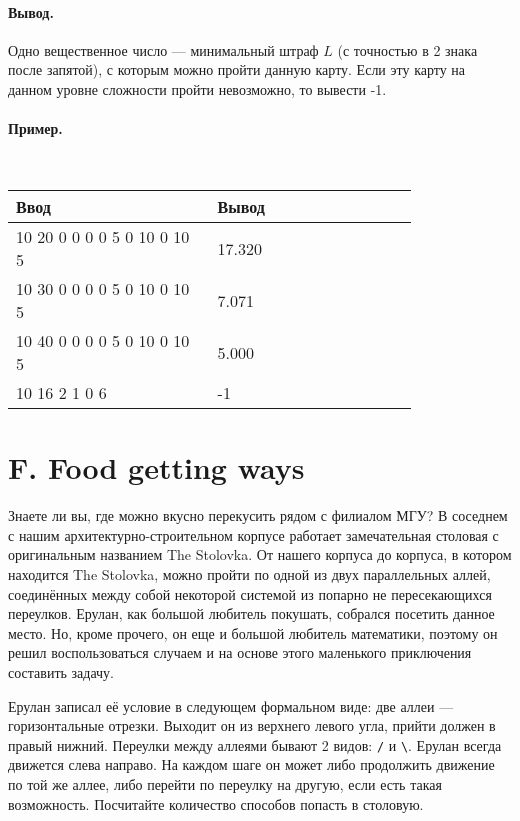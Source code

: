 \documentclass[12pt, a5paper]{article}
\newcommand{\outformat}[1]
{
	\paragraph{Вывод.\\} #1
}
\newcommand{\exampleeee}[8]
{
	\paragraph{Пример.\\}
	{\tt
	\begin{tabular}{|p{0.4\linewidth}|p{0.4\linewidth}|}
	\hline
	Ввод 	& Вывод  	\\
	\hline
	#1 		& #2 		\\
	\hline
	#3		& #4		\\
	\hline
	#5		& #6		\\
	\hline
	#7		& #8		\\
	\hline
	\end{tabular}
	}
}
\begin{document}
\outformat{Одно вещественное число --- минимальный штраф $L$ (с точностью в 2 знака после запятой), с которым можно пройти данную карту. Если эту карту на данном уровне сложности пройти невозможно, то вывести -1.}

\exampleeee{
10 20 \newline
5 \newline
5 0 0 \newline
10 0 0 \newline
10 5 0 \newline
10 10 0 \newline
10 10 5}
{17.320}
{10 30 \newline
5 \newline
5 0 0 \newline
10 0 0 \newline
10 5 0 \newline
10 10 0 \newline
10 10 5}
{7.071}
{10 40 \newline
5 \newline
5 0 0 \newline
10 0 0 \newline
10 5 0 \newline
10 10 0 \newline
10 10 5}
{5.000}
{10 16 \newline
2 \newline
6 2 1 \newline
4 0 6}
{-1}



\section*{F. Food getting ways}

Знаете ли вы, где можно вкусно перекусить рядом с филиалом МГУ? В соседнем с нашим архитектурно\--строительном корпусе работает замечательная столовая с оригинальным названием The Stolovka. От нашего корпуса до корпуса, в котором находится The Stolovka, можно пройти по одной из двух параллельных аллей, соединённых между собой некоторой системой из попарно не пересекающихся переулков. Ерулан, как большой любитель покушать, собрался посетить данное место. Но, кроме прочего, он еще и большой любитель математики, поэтому он решил воспользоваться случаем и на основе этого маленького приключения составить задачу. 




Ерулан записал её условие в следующем формальном виде: две аллеи --- горизонтальные отрезки. Выходит он из верхнего левого угла, прийти должен в правый нижний. Переулки между аллеями бывают 2 видов: {\tt /} и {\tt \textbackslash}. Ерулан всегда движется слева направо. На каждом шаге он может либо продолжить движение по той же аллее, либо перейти по переулку на другую, если есть такая возможность. Посчитайте количество способов попасть в столовую.
\end{document}
